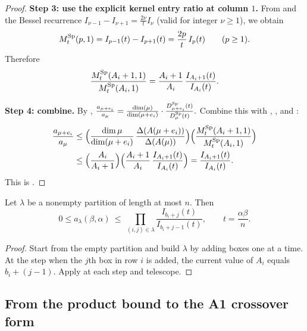\begin{proof}
\textbf{Step 3: use the explicit kernel entry ratio at column $1$.}
From  and the Bessel recurrence
$I_{\nu-1}-I_{\nu+1}=\tfrac{2\nu}{t}I_{\nu}$ (valid for integer $\nu\ge 1$), we obtain
\begin{equation}
\label{eq:Sp_kernel_col1_recurrence}
M_t^{\mathrm{Sp}}(p,1)=I_{p-1}(t)-I_{p+1}(t)=\frac{2p}{t}\,I_p(t)\qquad(p\ge 1).
\end{equation}
Therefore
\begin{equation}
\label{eq:Sp_M_ratio}
\frac{M_t^{\mathrm{Sp}}(A_i+1,1)}{M_t^{\mathrm{Sp}}(A_i,1)}
=\frac{A_i+1}{A_i}\,\frac{I_{A_i+1}(t)}{I_{A_i}(t)}.
\end{equation}

\textbf{Step 4: combine.}
By ,
\(
\frac{a_{\mu+e_i}}{a_{\mu}}
=\frac{\dim(\mu)}{\dim(\mu+e_i)}\cdot\frac{D^{\mathrm{Sp}}_{\mu+e_i}(t)}{D^{\mathrm{Sp}}_{\mu}(t)}.
\)
Combine this with , , and :
\begin{align*}
\frac{a_{\mu+e_i}}{a_{\mu}}
&\le \Big(\frac{\dim\mu}{\dim(\mu+e_i)}\,\frac{\Delta(A(\mu+e_i))}{\Delta(A(\mu))}\Big)
\Big(\frac{M_t^{\mathrm{Sp}}(A_i+1,1)}{M_t^{\mathrm{Sp}}(A_i,1)}\Big)
\\
&\le \Big(\frac{A_i}{A_i+1}\Big)\Big(\frac{A_i+1}{A_i}\,\frac{I_{A_i+1}(t)}{I_{A_i}(t)}\Big)
=\frac{I_{A_i+1}(t)}{I_{A_i}(t)}.
\end{align*}
This is .
\end{proof}

\begin{corollary}
\label{cor:Sp_telescoping}
Let $\lambda$ be a nonempty partition of length at most $n$.
Then
\begin{equation}
\label{eq:Sp_product_over_boxes}
0\le a_{\lambda}(\beta,\alpha)
\ \le\ \prod_{(i,j)\in\lambda}\frac{I_{b_i+j}(t)}{I_{b_i+j-1}(t)},
\qquad t=\frac{\alpha\beta}{n}.
\end{equation}
\end{corollary}

\begin{proof}
Start from the empty partition and build $\lambda$ by adding boxes one at a time.
At the step when the $j$th box in row $i$ is added, the current value of $A_i$ equals $b_i+(j-1)$.
Apply  at each step and telescope.
\end{proof}

\subsection{From the product bound to the A1 crossover form}
\label{subsec:A1_Sp_crossover}

